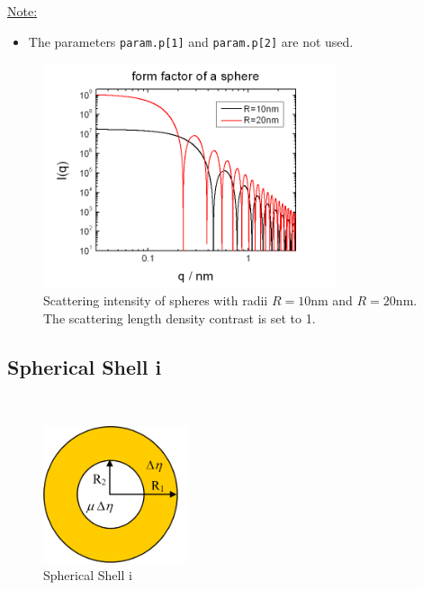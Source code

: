\noindent\uline{Note:}
\begin{itemize}
\item The parameters \texttt{param.p[1]} and \texttt{param.p[2]} are not used.
\end{itemize}

\begin{figure}[htb]
\begin{center}
\includegraphics[width=0.768\textwidth]{../images/form_factor/spheres/sphere_P.png}
\end{center}
\caption{Scattering intensity of spheres with radii $R=10$nm and $R=20$nm.
The scattering length density contrast is set to 1.} \label{fig:I_sphere}
\end{figure}

\clearpage

\subsection{Spherical Shell i}
\label{sect:spherical_shell_i} ~\\

\begin{figure}[htb]
\begin{center}
\includegraphics[width=0.38\textwidth]{../images/form_factor/spheres/shell1.png}
\end{center}
\caption{Spherical Shell i} \label{fig:shell1}
\end{figure}

